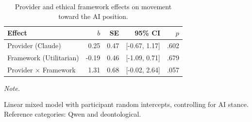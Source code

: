\begin{table}[h]
\centering
\caption{\label{tab:exploratory_main}Provider and ethical framework effects on movement toward the AI position.}
\fontsize{10}{12}\selectfont
\begin{threeparttable}
\begin{tabular}[t]{lrrrr}
\toprule
Effect & $b$ & SE & 95\% CI & $p$\\
\midrule
Provider (Claude) & 0.25 & 0.47 & {}[-0.67, 1.17] & .602\\
Framework (Utilitarian) & -0.19 & 0.46 & {}[-1.09, 0.71] & .679\\
Provider $\times$ Framework & 1.31 & 0.68 & {}[-0.02, 2.64] & .057\\
\bottomrule
\end{tabular}
\begin{tablenotes}
\item \textit{Note.}
\item Linear mixed model with participant random intercepts, controlling for AI stance. Reference categories: Qwen and deontological.
\end{tablenotes}
\end{threeparttable}
\end{table}

